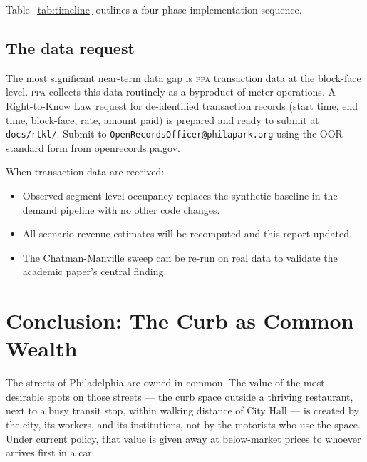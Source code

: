 \documentclass[11pt, letterpaper]{article}
\newcommand{\code}[1]{\texttt{\small #1}}
\newcommand{\ppa}{\textsc{ppa}}
\begin{document}
Table~\ref{tab:timeline} outlines a four-phase implementation sequence.

\begin{table}[H]
  \centering
  \caption{Proposed implementation timeline for Philadelphia curb pricing
  reform and parking benefit districts.}
  \label{tab:timeline}
  
\end{table}

\subsection{The data request}

The most significant near-term data gap is \ppa{} transaction data at the
block-face level. \ppa{} collects this data routinely as a byproduct of meter
operations. A Right-to-Know Law request for de-identified transaction records
(start time, end time, block-face, rate, amount paid) is prepared and ready
to submit at \code{docs/rtkl/}. Submit to
\code{OpenRecordsOfficer@philapark.org} using the OOR standard form from
\url{openrecords.pa.gov}.

When transaction data are received:
\begin{itemize}
  \item Observed segment-level occupancy replaces the synthetic baseline
        in the demand pipeline with no other code changes.
  \item All scenario revenue estimates will be recomputed and this report
        updated.
  \item The Chatman-Manville sweep can be re-run on real data to validate
        the academic paper's central finding.
\end{itemize}

\clearpage

\section{Conclusion: The Curb as Common Wealth}

The streets of Philadelphia are owned in common. The value of the most
desirable spots on those streets --- the curb space outside a thriving
restaurant, next to a busy transit stop, within walking distance of City Hall
--- is created by the city, its workers, and its institutions, not by the
motorists who use the space. Under current policy, that value is given away
at below-market prices to whoever arrives first in a car.
\end{document}
